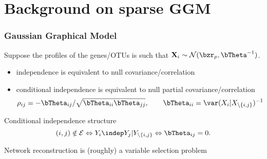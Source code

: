 \section{Background on sparse GGM}

\begin{frame}
  \frametitle{\alert{Gaussian} Graphical Model}

  Suppose   the   profiles   of    the   genes/OTUs   is   such   that
  $\mathbf{X}_i\sim\mathcal{N}(\bzr_p,\invcov^{-1})$.

  \begin{itemize}
  \item independence is equivalent to null covariance/correlation
  \item  \alert{  conditional  independence is  equivalent  to  null
      partial covariance/correlation}
    \begin{equation*}
      \label{eq:parcor2invcov}
      \rho_{ij}      =  -\invcov_{ij}      /
      \sqrt{\invcov_{ii} \invcov_{jj}}, \qquad \invcov_{ii}=
      \var(X_i|X_{\backslash \{i,j\}})^{-1}
    \end{equation*}
  \end{itemize}

  
  \begin{block}{Conditional independence structure}
    \vspace{-.5cm}
    \begin{equation*}
      (i,j)  \notin  \mathcal{E}  \Leftrightarrow  Y_i  \indep  Y_j  |
      Y_{\backslash \{i,j\}} \Leftrightarrow \invcov_{ij} = 0.
    \end{equation*}
  \end{block}
  
  \vspace{-.5cm}
  \vspace{-.5cm}
  
  \rsa Network reconstruction is (roughly) a variable selection problem
\end{frame}

